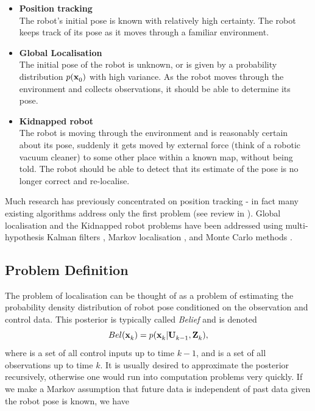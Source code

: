 \begin{itemize}
\item {\bf Position tracking}\\
      The robot's initial pose is known with relatively high
      certainty. The robot keeps track of its pose as it moves through a
      familiar environment.

\item {\bf Global Localisation}\\ 
      The initial pose of the robot is unknown, or is given by a
      probability distribution $p(\x{0}{}{})$ with high variance. As
      the robot moves through the environment and collects
      observations, it should be able to determine its pose.

\item {\bf Kidnapped robot}\\
      The robot is moving through the environment and is reasonably
      certain about its pose, suddenly it gets moved by external force
      (think of a robotic vacuum cleaner) to some other place within a
      known map, without being told. The robot should be able to
      detect that its estimate of the pose is no longer correct and
      re-localise.
\end{itemize}

Much research has previously concentrated on position tracking - in
fact many existing algorithms address only the first problem (see
review in \cite{Borenstein96}). Global localisation and the Kidnapped
robot problems have been addressed using multi-hypothesis Kalman
filters \cite{JensfeltKristensen01,Cox94}, Markov localisation
\cite{Fox99}, and Monte Carlo methods \cite{Thrun00j}.


\subsection{Problem Definition}

The problem of localisation can be thought of as a problem of
estimating the probability density distribution of robot pose
conditioned on the observation and control data.  This posterior is
typically called {\it Belief} and is denoted
\begin{equation}
  Bel(\x{k}{}{}) = p(\x{k}{}{} | \Uall{k-1}{}, \Zall{k}{}),
\label{eqn:localise_belief}
\end{equation}
where  is a set of all control inputs up to time $k-1$, and
 is a set of all observations up to time $k$. It is usually
desired to approximate the posterior recursively, otherwise one would
run into computation problems very quickly.  If we make a Markov
assumption that future data is independent of past data given the
robot pose is known, we have

